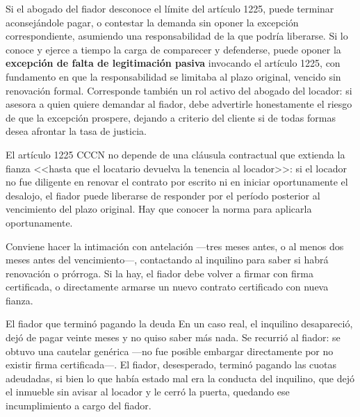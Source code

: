 \documentclass[12pt,oneside]{book}
\begin{document}
Si el abogado del fiador desconoce el límite del artículo 1225, puede terminar aconsejándole pagar, o contestar la demanda sin oponer la excepción correspondiente, asumiendo una responsabilidad de la que podría liberarse. Si lo conoce y ejerce a tiempo la carga de comparecer y defenderse, puede oponer la \textbf{excepción de falta de legitimación pasiva} invocando el artículo 1225, con fundamento en que la responsabilidad se limitaba al plazo original, vencido sin renovación formal. Corresponde también un rol activo del abogado del locador: si asesora a quien quiere demandar al fiador, debe advertirle honestamente el riesgo de que la excepción prospere, dejando a criterio del cliente si de todas formas desea afrontar la tasa de justicia.

\begin{important}
El artículo 1225 CCCN no depende de una cláusula contractual que extienda la fianza <<hasta que el locatario devuelva la tenencia al locador>>: si el locador no fue diligente en renovar el contrato por escrito ni en iniciar oportunamente el desalojo, el fiador puede liberarse de responder por el período posterior al vencimiento del plazo original. Hay que conocer la norma para aplicarla oportunamente.
\end{important}

\begin{note}
Conviene hacer la intimación con antelación ---tres meses antes, o al menos dos meses antes del vencimiento---, contactando al inquilino para saber si habrá renovación o prórroga. Si la hay, el fiador debe volver a firmar con firma certificada, o directamente armarse un nuevo contrato certificado con nueva fianza.
\end{note}

\begin{example}{El fiador que terminó pagando la deuda}
En un caso real, el inquilino desapareció, dejó de pagar veinte meses y no quiso saber más nada. Se recurrió al fiador: se obtuvo una cautelar genérica ---no fue posible embargar directamente por no existir firma certificada---. El fiador, desesperado, terminó pagando las cuotas adeudadas, si bien lo que había estado mal era la conducta del inquilino, que dejó el inmueble sin avisar al locador y le cerró la puerta, quedando ese incumplimiento a cargo del fiador.
\end{example}
\end{document}
